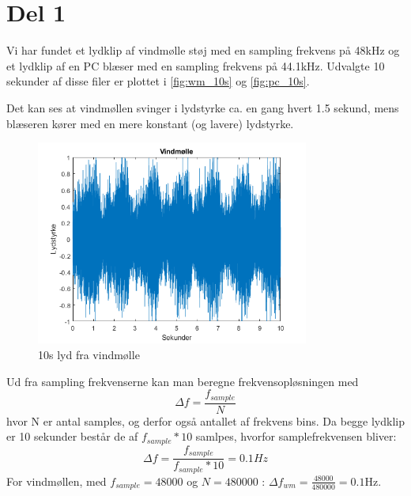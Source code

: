 \section{Del 1}

Vi har fundet et lydklip af vindmølle støj med en sampling frekvens på 48kHz og et lydklip af en PC blæser med en sampling frekvens på 44.1kHz. Udvalgte 10 sekunder af disse filer er plottet i \autoref{fig:wm_10s} og \autoref{fig:pc_10s}.

Det kan ses at vindmøllen svinger i lydstyrke ca. en gang hvert 1.5 sekund, mens blæseren kører med en mere konstant (og lavere) lydstyrke.


\begin{figure}[h]
\centering
\includegraphics[width=0.8\textwidth]{"figures/Windmill_10s"}
\caption{10s lyd fra vindmølle}
\label{fig:wm_10s}
\end{figure}

Ud fra sampling frekvenserne kan man beregne frekvensopløsningen med 
\begin{equation}
\Delta f = \frac{f_{sample}}{N}
\end{equation}
hvor N er antal samples, og derfor også antallet af frekvens bins.
Da begge lydklip er 10 sekunder består de af $f_{sample}*10$ samlpes, hvorfor samplefrekvensen bliver: 
\begin{equation}
\Delta f = \frac{f_{sample}}{f_{sample}*10} = 0.1 Hz
\end{equation}
For vindmøllen, med $f_{sample}=48000$ og $N=480000$ : $\Delta f_{wm} = \frac{48000}{480000} = 0.1$Hz.

